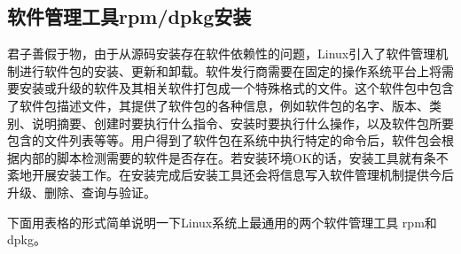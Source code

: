 \subsection{软件管理工具rpm/dpkg安装}
君子善假于物，由于从源码安装存在软件依赖性的问题，Linux引入了软件管理机制进行软件包的安装、更新和卸载。软件发行商需要在固定的操作系统平台上将需要安装或升级的软件及其相关软件打包成一个特殊格式的文件。这个软件包中包含了软件包描述文件，其提供了软件包的各种信息，例如软件包的名字、版本、类别、说明摘要、创建时要执行什么指令、安装时要执行什么操作，以及软件包所要包含的文件列表等等。用户得到了软件包在系统中执行特定的命令后，软件包会根据内部的脚本检测需要的软件是否存在。若安装环境OK的话，安装工具就有条不紊地开展安装工作。在安装完成后安装工具还会将信息写入软件管理机制提供今后升级、删除、查询与验证。

下面用表格的形式简单说明一下Linux系统上最通用的两个软件管理工具 rpm和dpkg。
\newpage
